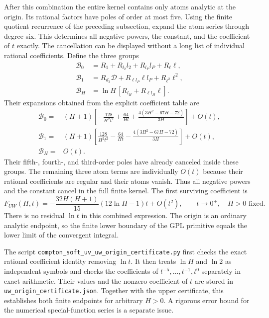After this combination the entire kernel contains only atoms analytic
at the origin.  Its rational factors have poles of order at most five.
Using the finite quotient recurrence of the preceding subsection,
expand the atom series through degree six.  This determines all negative
powers, the constant, and the coefficient of $t$ exactly.
The cancellation can be displayed without a long list of individual
rational coefficients.  Define the three groups
\begin{align}
 \mathcal B_0&=R_1+R_{l_2}l_2+R_{l_P}l_P+R_\ell\ell,\\
 \mathcal B_1&=R_{d_3}\mathcal D+R_{\ell l_P}\ell l_P+R_{\ell^2}\ell^2,\\
 \mathcal B_H&=\ln H\,[R_{l_H}+R_{\ell l_H}\ell].
\end{align}
Their expansions obtained from the explicit coefficient table are
\begin{align}
 \mathcal B_0={}&(H+1)\left[-\frac{128}{H^2t^2}+
 \frac{64}{Ht}+\frac{4(3H^2-67H-72)}{3H}\right]+O(t),\\
 \mathcal B_1={}&(H+1)\left[\frac{128}{H^2t^2}-
 \frac{64}{Ht}-\frac{4(3H^2-67H-72)}{3H}\right]+O(t),\\
 \mathcal B_H={}&O(t).
\end{align}
Their fifth-, fourth-, and third-order poles have already canceled
inside these groups.  The remaining three atom terms are individually
$O(t)$ because their rational coefficients are regular and their atoms
vanish.  Thus all negative powers and the constant cancel in the full
finite kernel.  The first surviving coefficient is
\begin{equation}
 F_{UW}(H,t)=-\frac{32H(H+1)}{15}(12\ln H-1)t+O(t^2),
                    \qquad t\to0^+,\quad H>0\text{ fixed}.
\end{equation}
There is no residual $\ln t$ in this combined expression.  The origin is
an ordinary analytic endpoint, so the finite lower boundary of the GPL
primitive equals the lower limit of the convergent integral.

The script \nolinkurl{compton_soft_uv_uw_origin_certificate.py} first
checks the exact rational coefficient identity removing $\ln t$.
It then treats $\ln H$ and $\ln2$ as independent symbols and checks
the coefficients of $t^{-5},\ldots,t^{-1},t^0$ separately in exact
arithmetic.  Their values and the nonzero coefficient of $t$ are stored
in \nolinkurl{uw_origin_certificate.json}.  Together with the upper
certificate, this establishes both finite endpoints for arbitrary
$H>0$.  A rigorous error bound for the numerical special-function
series is a separate issue.

